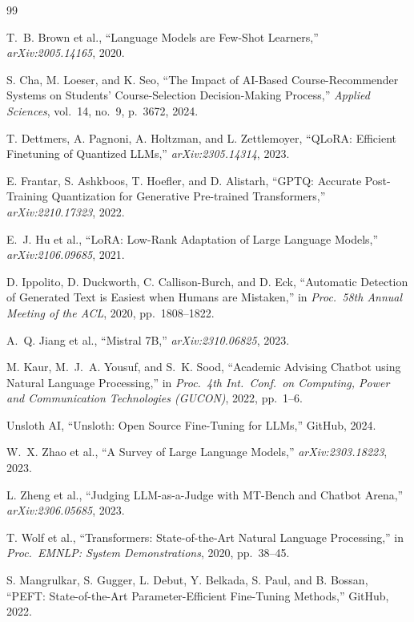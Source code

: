 \documentclass[11pt]{article}
\begin{document}
\begin{thebibliography}{99}

T.~B. Brown et al., ``Language Models are Few-Shot Learners,'' \textit{arXiv:2005.14165}, 2020.

S. Cha, M. Loeser, and K. Seo, ``The Impact of AI-Based Course-Recommender Systems on Students' Course-Selection Decision-Making Process,'' \textit{Applied Sciences}, vol.~14, no.~9, p.~3672, 2024.

T. Dettmers, A. Pagnoni, A. Holtzman, and L. Zettlemoyer, ``QLoRA: Efficient Finetuning of Quantized LLMs,'' \textit{arXiv:2305.14314}, 2023.

E. Frantar, S. Ashkboos, T. Hoefler, and D. Alistarh, ``GPTQ: Accurate Post-Training Quantization for Generative Pre-trained Transformers,'' \textit{arXiv:2210.17323}, 2022.

E.~J. Hu et al., ``LoRA: Low-Rank Adaptation of Large Language Models,'' \textit{arXiv:2106.09685}, 2021.

D. Ippolito, D. Duckworth, C. Callison-Burch, and D. Eck, ``Automatic Detection of Generated Text is Easiest when Humans are Mistaken,'' in \textit{Proc.\ 58th Annual Meeting of the ACL}, 2020, pp.~1808--1822.

A.~Q. Jiang et al., ``Mistral 7B,'' \textit{arXiv:2310.06825}, 2023.

M. Kaur, M.~J.~A. Yousuf, and S.~K. Sood, ``Academic Advising Chatbot using Natural Language Processing,'' in \textit{Proc.\ 4th Int.\ Conf.\ on Computing, Power and Communication Technologies (GUCON)}, 2022, pp.~1--6.

Unsloth AI, ``Unsloth: Open Source Fine-Tuning for LLMs,'' GitHub, 2024.

W.~X. Zhao et al., ``A Survey of Large Language Models,'' \textit{arXiv:2303.18223}, 2023.

L. Zheng et al., ``Judging LLM-as-a-Judge with MT-Bench and Chatbot Arena,'' \textit{arXiv:2306.05685}, 2023.

T. Wolf et al., ``Transformers: State-of-the-Art Natural Language Processing,'' in \textit{Proc.\ EMNLP: System Demonstrations}, 2020, pp.~38--45.

S. Mangrulkar, S. Gugger, L. Debut, Y. Belkada, S. Paul, and B. Bossan, ``PEFT: State-of-the-Art Parameter-Efficient Fine-Tuning Methods,'' GitHub, 2022.


\end{thebibliography}
\end{document}

